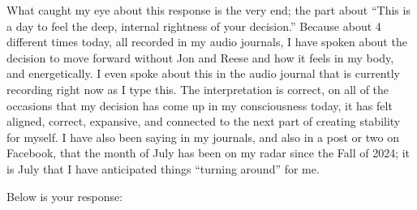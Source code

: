 \documentclass{article}
\begin{document}
What caught my eye about this response is the very end; the part about ``This is a day to feel the deep, internal rightness of your decision.'' Because about 4 different times today, all recorded in my audio journals, I have spoken about the decision to move forward without Jon and Reese and how it feels in my body, and energetically. I even spoke about this in the audio journal that is currently recording right now as I type this. The interpretation is correct, on all of the occasions that my decision has come up in my consciousness today, it has felt aligned, correct, expansive, and connected to the next part of creating stability for myself. I have also been saying in my journals, and also in a post or two on Facebook, that the month of July has been on my radar since the Fall of 2024; it is July that I have anticipated things ``turning around'' for me.

Below is your response:
\end{document}
